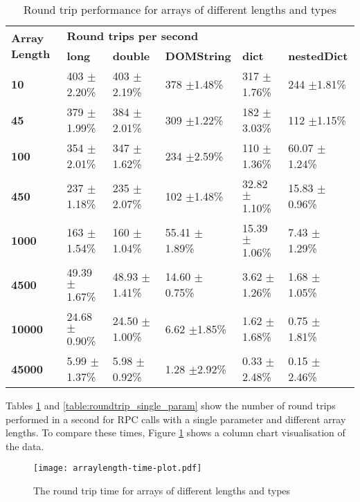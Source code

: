 \begin{table}[h]
\begin{tabular}{l|lllll}
\multirow{2}{*}{\textbf{Array Length}} & \multicolumn{5}{l}{\textbf{Round trips per second}}                                        \\
                                       & \textbf{long} & \textbf{double} & \textbf{DOMString} & \textbf{dict} & \textbf{nestedDict} \\ \hline
\textbf{10}                            & 403 $\pm$2.20\%   & 403 $\pm$2.19\%     & 378 $\pm$1.48\%        & 317 $\pm$1.76\%   & 244 $\pm$1.81\%         \\
\textbf{45}                            & 379 $\pm$1.99\%   & 384 $\pm$2.01\%     & 309 $\pm$1.22\%        & 182 $\pm$3.03\%   & 112 $\pm$1.15\%         \\
\textbf{100}                           & 354 $\pm$2.01\%   & 347 $\pm$1.62\%     & 234 $\pm$2.59\%        & 110 $\pm$1.36\%   & 60.07 $\pm$1.24\%       \\
\textbf{450}                           & 237 $\pm$1.18\%   & 235 $\pm$2.07\%     & 102 $\pm$1.48\%        & 32.82 $\pm$1.10\% & 15.83 $\pm$0.96\%       \\
\textbf{1000}                          & 163 $\pm$1.54\%   & 160 $\pm$1.04\%     & 55.41 $\pm$1.89\%      & 15.39 $\pm$1.06\% & 7.43 $\pm$1.29\%        \\
\textbf{4500}                          & 49.39 $\pm$1.67\% & 48.93 $\pm$1.41\%   & 14.60 $\pm$0.75\%      & 3.62 $\pm$1.26\%  & 1.68 $\pm$1.05\%        \\
\textbf{10000}                         & 24.68 $\pm$0.90\% & 24.50 $\pm$1.00\%   & 6.62 $\pm$1.85\%       & 1.62 $\pm$1.68\%  & 0.75 $\pm$1.81\%        \\
\textbf{45000}                         & 5.99 $\pm$1.37\%  & 5.98 $\pm$0.92\%    & 1.28 $\pm$2.92\%       & 0.33 $\pm$2.48\%  & 0.15 $\pm$2.46\%       
\end{tabular}
\caption{Round trip performance for arrays of different lengths and types}
\label{table:roundtrip_array}
\end{table}

Tables \ref{table:roundtrip_array} and \ref{table:roundtrip_single_param} show the number of round trips performed in a second for RPC calls with a single parameter and different array lengths. To compare these times, Figure \ref{fig:arraylength-time-plot} shows a column chart visualisation of the data.

\begin{figure}
    \centering
    \texttt{[image: arraylength-time-plot.pdf]} 
    \caption{The round trip time for arrays of different lengths and types}
    \label{fig:arraylength-time-plot}
\end{figure}


